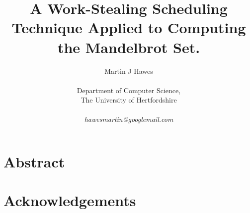 

\title{
\huge A Work-Stealing Scheduling Technique Applied to Computing the Mandelbrot Set.
}

\author{
  Martin J Hawes\\
  \\
  Department of Computer Science, \\
  The University of Hertfordshire \\ 
  \\
  \textit{hawesmartin@googlemail.com}\\
}



\maketitle
\date{}

\section*{Abstract}


\section*{Acknowledgements}


\clearpage
{}
\setcounter{page}{1}
\tableofcontents

